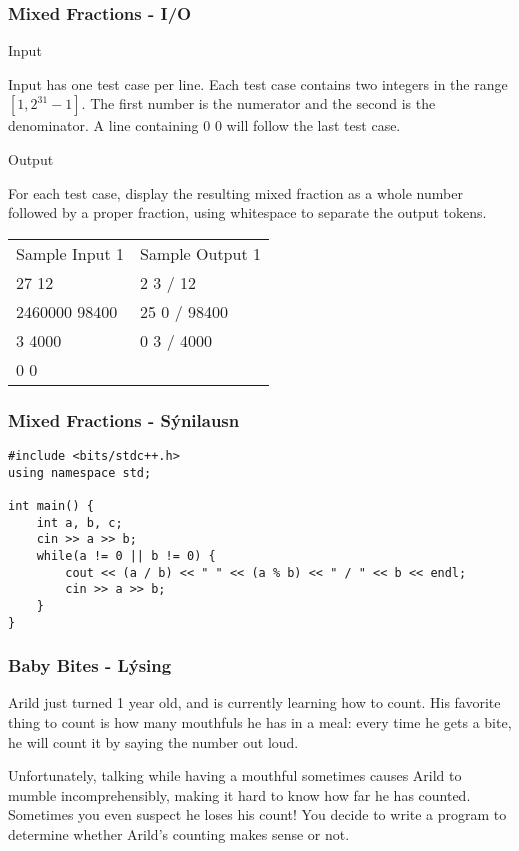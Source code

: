 \documentclass{beamer}
\begin{document}
\begin{frame}
\frametitle{Mixed Fractions - I/O}
\begin{large}
Input \\
\end{large}
\begin{small}
Input has one test case per line. Each test case contains two integers in the range $[1, 2^{31}-1]$. The first number is the numerator and the second is the denominator. A line containing 0 0 will follow the last test case. \\
\end{small}
\begin{large}
Output \\
\end{large}
\begin{small}
For each test case, display the resulting mixed fraction as a whole number followed by a proper fraction, using whitespace to separate the output tokens. \\

\begin{tabular}{ll}
Sample Input 1 & Sample Output 1 \\
27 12 & 2 3 / 12 \\
2460000 98400 & 25 0 / 98400 \\
3 4000 & 0 3 / 4000 \\
0 0 & \\
\end{tabular}
\end{small}
\end{frame}

\begin{frame}[fragile]
\frametitle{Mixed Fractions - Sýnilausn}
\begin{small}
\begin{verbatim}
#include <bits/stdc++.h>
using namespace std;

int main() {
    int a, b, c;
    cin >> a >> b;
    while(a != 0 || b != 0) {
        cout << (a / b) << " " << (a % b) << " / " << b << endl;
        cin >> a >> b;
    }
}
\end{verbatim}
\end{small}
\end{frame}

\begin{frame}
\frametitle{Baby Bites - Lýsing}
\begin{small}
Arild just turned 1 year old, and is currently learning how to count. His favorite thing to count is how many mouthfuls he has in a meal: every time he gets a bite, he will count it by saying the number out loud.

Unfortunately, talking while having a mouthful sometimes causes Arild to mumble incomprehensibly, making it hard to know how far he has counted. Sometimes you even suspect he loses his count! You decide to write a program to determine whether Arild’s counting makes sense or not.
\end{small}
\end{frame}
\end{document}
